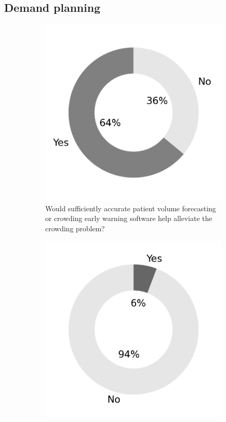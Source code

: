 \documentclass{article}
\begin{document}
\subsection{Demand planning}
\lipsum[4-6]

\begin{figure}[H]
    \centering
    \begin{subfigure}[b]{0.45\textwidth}
        \includegraphics[width=\textwidth]{../output/plots/benefit}
        \caption{Would sufficiently accurate patient volume forecasting or crowding early warning software help alleviate the crowding problem?}
        \label{fig:benefit}
    \end{subfigure}
    \begin{subfigure}[b]{0.45\textwidth}
        \includegraphics[width=\textwidth]{../output/plots/software_usage}

\end{subfigure}
\end{figure}
\end{document}
